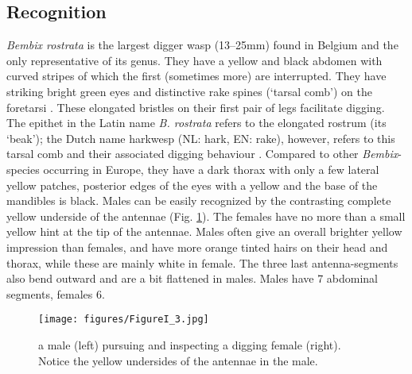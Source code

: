 \documentclass[10pt, twoside]{book} %
\begin{document}
	\subsection{Recognition}
	\textit{Bembix rostrata} is the largest digger wasp (13--25mm) found in Belgium and the only representative of its genus. They have a yellow and black abdomen with curved stripes of which the first (sometimes more) are interrupted. They have striking bright green eyes and distinctive rake spines (`tarsal comb') on the foretarsi \citep{evans2007}. These elongated bristles on their first pair of legs facilitate digging. The epithet in the Latin name \textit{B. rostrata} refers to the elongated rostrum (its `beak'); the Dutch name harkwesp (NL: hark, EN: rake), however, refers to this tarsal comb and their associated digging behaviour \citep{thijsse1901}. Compared to other \textit{Bembix}-species occurring in Europe, they have a dark thorax with only a few lateral yellow patches, posterior edges of the eyes with a yellow and the base of the mandibles is black. Males can be easily recognized by the contrasting complete yellow underside of the antennae (Fig. \ref{figI.3}). The females have no more than a small yellow hint at the tip of the antennae. Males often give an overall brighter yellow impression than females, and have more orange tinted hairs on their head and thorax, while these are mainly white in female. The three last antenna-segments also bend outward and are a bit flattened in males. Males have 7 abdominal segments, females 6.\\
	
	\begin{figure}[hb!]
		\begin{center}
			\texttt{[image: figures/FigureI\_3.jpg]}
		\end{center}
		\begin{footnotesize}
			\caption{a male (left) pursuing and inspecting a digging female (right). Notice the yellow undersides of the antennae in the male. \label{figI.3}}
		\end{footnotesize}
	\end{figure}
\end{document}
